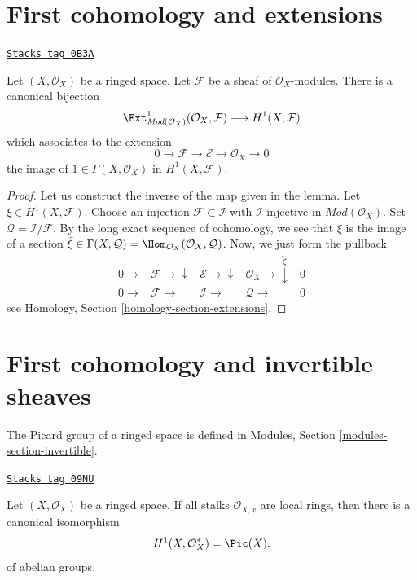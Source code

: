 \section{First cohomology and extensions}
\label{cohomology-section-h1-extensions}
\begin{lemma}[H1 extensions]
\label{cohomology-lemma-h1-extensions}
\href{https://stacks.math.columbia.edu/tag/0B3A}{\texttt{Stacks tag 0B3A}}

Let $(X, \mathcal{O}_X)$ be a ringed space. Let $\mathcal{F}$ be a sheaf of
$\mathcal{O}_X$-modules. There is a canonical bijection
$$
\Ext^1_{\textit{Mod}(\mathcal{O}_X)}(\mathcal{O}_X, \mathcal{F})
\longrightarrow
H^1(X, \mathcal{F})
$$
which associates to the extension
$$
0 \to \mathcal{F} \to \mathcal{E} \to \mathcal{O}_X \to 0
$$
the image of $1 \in \Gamma(X, \mathcal{O}_X)$ in $H^1(X, \mathcal{F})$.
\end{lemma}

\begin{proof}
Let us construct the inverse of the map given in the lemma. Let
$\xi \in H^1(X, \mathcal{F})$. Choose an injection
$\mathcal{F} \subset \mathcal{I}$ with $\mathcal{I}$ injective in
$\textit{Mod}(\mathcal{O}_X)$.
Set $\mathcal{Q} = \mathcal{I}/\mathcal{F}$.
By the long exact sequence of cohomology, we see that
$\xi$ is the image of a section
$\tilde \xi \in \Gamma(X, \mathcal{Q}) =
\Hom_{\mathcal{O}_X}(\mathcal{O}_X, \mathcal{Q})$.
Now, we just form the pullback
$$
\begin{array}{ccccc}0 \longrightarrow & \mathcal{F} \longrightarrow\downarrow & \mathcal{E} \longrightarrow\downarrow & \mathcal{O}_X \longrightarrow\overset{\tilde \xi}{\downarrow} & 0 \\ 0 \longrightarrow & \mathcal{F} \longrightarrow & \mathcal{I} \longrightarrow & \mathcal{Q} \longrightarrow & 0\end{array}
$$
see Homology, Section \ref{homology-section-extensions}.
\end{proof}

\section{First cohomology and invertible sheaves}
\label{cohomology-section-invertible-sheaves}
The Picard group of a ringed space is defined in
Modules, Section \ref{modules-section-invertible}.

\begin{lemma}[H1 invertible]
\label{cohomology-lemma-h1-invertible}
\href{https://stacks.math.columbia.edu/tag/09NU}{\texttt{Stacks tag 09NU}}

Let $(X, \mathcal{O}_X)$ be a ringed space. If all stalks
$\mathcal{O}_{X, x}$ are local rings, then there is a canonical isomorphism
$$
H^1(X, \mathcal{O}_X^*) = \Pic(X).
$$
of abelian groups.
\end{lemma}

